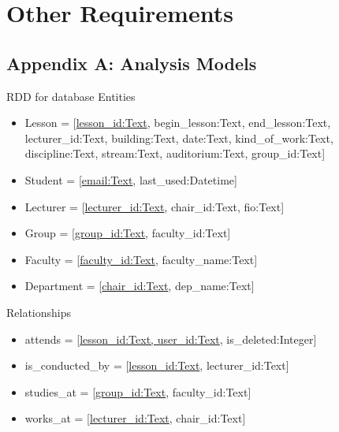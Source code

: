 \documentclass{scrreprt}
\begin{document}
\chapter{Other Requirements}

\section{Appendix A: Analysis Models}
\begin{figure}[h]
\end{figure}

RDD for database
Entities
\begin{itemize}
\item Lesson = {[\underline{lesson_id:Text}, begin_lesson:Text, end_lesson:Text, lecturer_id:Text, building:Text, date:Text, kind_of_work:Text, discipline:Text, stream:Text, auditorium:Text, group_id:Text]} 
\item Student = {[\underline{email:Text}, last_used:Datetime]}
\item Lecturer = {[\underline{lecturer_id:Text}, chair_id:Text, fio:Text]}
\item Group = {[\underline{group_id:Text}, faculty_id:Text]}
\item Faculty = {[\underline{faculty_id:Text}, faculty_name:Text]}  
\item Department = {[\underline{chair_id:Text}, dep_name:Text]}  
\end{itemize}

Relationships
\begin{itemize}
\item attends = {[\underline{lesson_id:Text, user_id:Text}, is_deleted:Integer]}
\item is_conducted_by = {[\underline{lesson_id:Text}, lecturer_id:Text]}
\item studies_at = {[\underline{group_id:Text}, faculty_id:Text]}
\item works_at = {[\underline{lecturer_id:Text}, chair_id:Text]}
\end{itemize}
\end{document}
